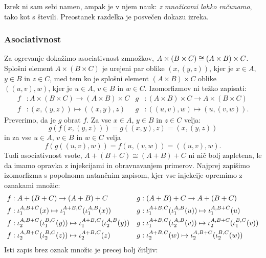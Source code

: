 Izrek ni sam sebi namen, ampak je v njem nauk: \emph{z množicami lahko računamo}, tako kot
s števili. Preostanek razdelka je posvečen dokazu izreka.

\subsubsection{Asociativnost}
\label{sec:asociativnost}

Za ogrevanje dokažimo asociativnost zmnožkov,
$A \times (B \times C) \cong (A \times B) \times C$. Splošni element
$A \times (B \times C)$ je urejeni par oblike $(x, (y, z))$, kjer je $x \in A$, $y \in B$
in $z \in C$, med tem ko je splošni element $(A \times B) \times C$ oblike $((u, v), w)$,
kjer je $u \in A$, $v \in B$ in $w \in C$. Izomorfizmov ni težko zapisati:
%
\begin{align*}
  f &:  A \times (B \times C) \to (A \times B) \times C &
  g &: (A \times B) \times C \to A \times (B \times C) \\
  f &: (x, (y, z)) \mapsto ((x, y), z) &
  g &: ((u, v), w) \mapsto (u, (v, w)).
\end{align*}
%
Preverimo, da je $g$ obrat $f$. Za vse $x \in A$, $y \in B$ in $z \in C$ velja:
%
\begin{equation*}
  g(f(x, (y, z))) = g((x, y), z) = (x, (y, z))
\end{equation*}
%
in za vse $u \in A$, $v \in B$ in $w \in C$ velja
%
\begin{equation*}
  f(g((u, v), w)) = f(u, (v, w)) = ((u, v), w).
\end{equation*}
%
Tudi asociativnost vsote, $A + (B + C) \cong (A + B) + C$ ni nič bolj zapletena, le da
imamo opravka z injekcijami in obravnavanjem primerov. Najprej zapišimo izomorfizma s
popolnoma natančnim zapisom, kjer vse injekcije opremimo z oznakami množic:
%
\begin{align*}
  f &:  A + (B + C) \to (A + B) + C &
  g &: (A + B) + C \to A + (B + C) \\
  f &: \inl[A][B+C](x)             \mapsto \inl[A+B][C](\inl[A][B](x)) &
  g &: \inl[A+B][C](\inl[A][B](u)) \mapsto \inl[A][B+C](u)\\
  f &: \inr[A][B+C](\inl[B][C](y)) \mapsto \inl[A+B][C](\inr[A][B](y)) &
  g &: \inl[A+B][C](\inr[A][B](v)) \mapsto \inr[A][B+C](\inl[B][C](v))  \\
  f &: \inr[A][B+C](\inr[B][C](z)) \mapsto \inr[A+B][C](z) &
  g &: \inr[A+B][C](w)              \mapsto \inr[A][B+C](\inr[B][C](w))
\end{align*}
%
Isti zapis brez oznak množic je precej bolj čitljiv:
